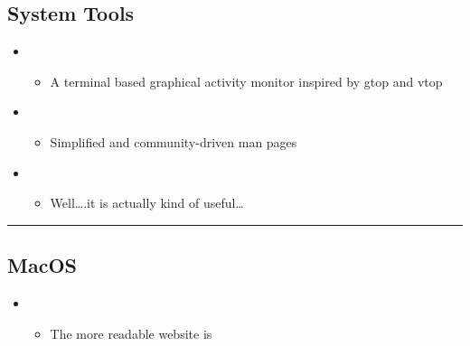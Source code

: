 \documentclass[letterpaper,10pt,english]{sphinxmanual}
\begin{document}
\subsection{System Tools}
\label{\detokenize{resource/research/computer_basics:system-tools}}\begin{itemize}
\item {} 
\begin{itemize}
\item {} 
A terminal based graphical activity monitor inspired by gtop and
vtop

\end{itemize}

\item {} 
\begin{itemize}
\item {} 
Simplified and community-driven man pages

\end{itemize}

\item {} 
\begin{itemize}
\item {} 
Well….it is actually kind of useful…

\end{itemize}

\end{itemize}


\bigskip\hrule\bigskip



\subsection{MacOS}
\label{\detokenize{resource/research/computer_basics:macos}}\begin{itemize}
\item {} 
\begin{itemize}
\item {} 
The more readable website is

\end{itemize}

\end{itemize}
\end{document}
